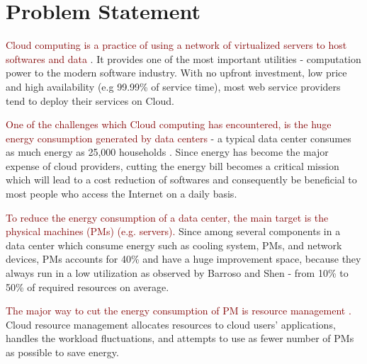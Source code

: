 \section{Problem Statement}


\textcolor{Maroon}{Cloud computing is a practice of using a network of virtualized servers to host softwares and data \cite{Mell:2011jj}}. It provides one of the most important utilities - computation power to the modern software industry. With no upfront investment, low price and high availability (e.g 99.99\% of service time), most web service providers tend to deploy their services on Cloud. 

\textcolor{Maroon}{One of the challenges which Cloud computing has encountered, is the huge energy consumption generated by data centers} - a typical data center consumes as much energy as 25,000 households \cite{Dayarathna:2016ua}. Since energy has become the major expense of cloud providers, cutting the energy bill becomes a critical mission which will lead to a cost reduction of softwares and consequently be beneficial to most people who access the Internet on a daily basis.

\textcolor{Maroon}{To reduce the energy consumption of a data center, the main target is the physical machines (PMs) (e.g. servers).} Since among several components in a data center which consume energy such as cooling system, PMs, and network devices, PMs accounts for 40\% and have a huge improvement space, because they always run in a low utilization as observed by Barroso and Shen \cite{Barroso:2007jt,Shen:2015hm} - from 10\% to 50\% of required resources on average.

\textcolor{Maroon}{The major way to cut the energy consumption of PM is resource management \cite{Manvi:2014hm}.} Cloud resource management allocates resources to cloud users' applications, handles the workload fluctuations, and attempts to use as fewer number of PMs as possible to save energy. 

